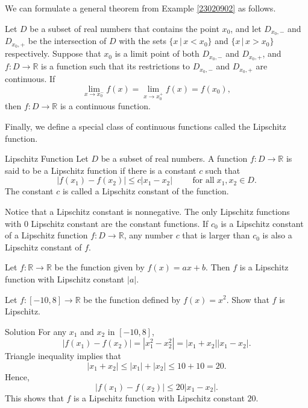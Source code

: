 \begin{remark}{}
We can formulate a general theorem from Example \ref{23020902} as follows. 

Let $D$ be a subset of real numbers that contains the point $x_0$, and let $D_{x_0,-}$ and $D_{x_0,+}$ be the intersection of $D$ with the sets $\{x\,|\,x<x_0\}$ and $\{x\,|\,x>x_0\}$ respectively. Suppose that $x_0$ is a limit point of both $D_{x_0,-}$ and $D_{x_0, +}$, and $f:D\rightarrow\mathbb{R}$ is a function such that  its restrictions to $D_{x_0,-}$ and $D_{x_0, +}$ are continuous. If
\[\lim_{x\rightarrow x_0^-}f(x)=\lim_{x\rightarrow  x_0^+}f(x)=f(x_0),\] then $f:D\rightarrow\mathbb{R}$ is a continuous function.
\end{remark}

Finally, we define a special class of continuous functions called the Lipschitz function.

\begin{definition}{Lipschitz Function}
Let $D$ be a subset of real numbers. A function $f:D\rightarrow \mathbb{R}$ is said to be a Lipschitz function if there is a  constant $c$ such that
\[|f(x_1)-f(x_2)|\leq c|x_1-x_2|\hspace{1cm}\text{for all}\;x_1, x_2\in D.\]
The constant $c$ is called a Lipschitz constant of the function.
\end{definition}

Notice that a Lipschitz constant is nonnegative. The only  Lipschitz functions with 0 Lipschitz constant  are the constant functions. If $c_0$ is a Lipschitz constant of a Lipschitz function $f:D\rightarrow \mathbb{R}$, any number $c$ that is larger than $c_0$ is also a Lipschitz constant of $f$.

\begin{example}{}
Let $f:\mathbb{R}\rightarrow\mathbb{R}$ be the function given by $f(x)=ax+b$. Then $f$ is a Lipschitz function with Lipschitz constant $|a|$.
\end{example}

\begin{example}[label=23021007]{}
Let $f:[-10, 8]\rightarrow \mathbb{R}$ be the function defined by $f(x)=x^2$. Show that $f$ is Lipschitz.
\end{example}
\begin{solution}{Solution}
For any $x_1$ and $x_2$ in $[-10, 8]$, 
\[|f(x_1)-f(x_2)|=|x_1^2-x_2^2|=|x_1+x_2||x_1-x_2|.\]
Triangle inequality implies that
\[|x_1+x_2|\leq |x_1|+|x_2|\leq 10+10=20.\]
Hence,
\[|f(x_1)-f(x_2)|\leq 20|x_1-x_2|.\]
This shows that $f$ is a Lipschitz function with Lipschitz constant $20$.
\end{solution}

